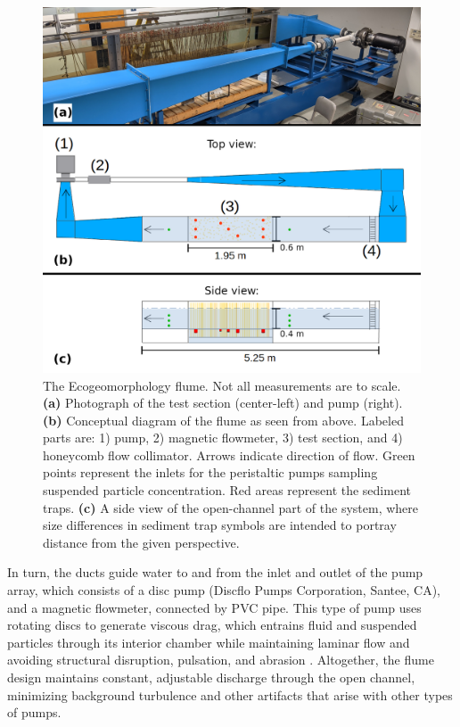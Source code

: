\documentclass[geosciences,article,submit,moreauthors,pdftex]{Definitions/mdpi}
\begin{document}
\begin{figure}[htb]
\includegraphics[width=5in]{../pics/flume_with_sedtraps.png}
\centering
\caption{The Ecogeomorphology flume. Not all measurements are to scale. \textbf{(a)} Photograph of the test section (center-left) and pump (right). \textbf{(b)} Conceptual diagram of the flume as seen from above. Labeled parts are: 1) pump, 2) magnetic flowmeter, 3) test section, and 4) honeycomb flow collimator. Arrows indicate direction of flow. Green points represent the inlets for the peristaltic pumps sampling suspended particle concentration. Red areas represent the sediment traps. \textbf{(c)} A side view of the open-channel part of the system, where size differences in sediment trap symbols are intended to portray distance from the given perspective.}
\label{fig:floorplan}
\end{figure}

In turn, the ducts guide water to and from the inlet and outlet of the pump array, which consists of a disc pump (Discflo Pumps Corporation, Santee, CA), and a magnetic flowmeter, connected by PVC pipe. This type of pump uses rotating discs to generate viscous drag, which entrains fluid and suspended particles through its interior chamber while maintaining laminar flow and avoiding structural disruption, pulsation, and abrasion \cite{discflo}. Altogether, the flume design maintains constant, adjustable discharge through the open channel, minimizing background turbulence and other artifacts that arise with other types of pumps.
\end{document}
